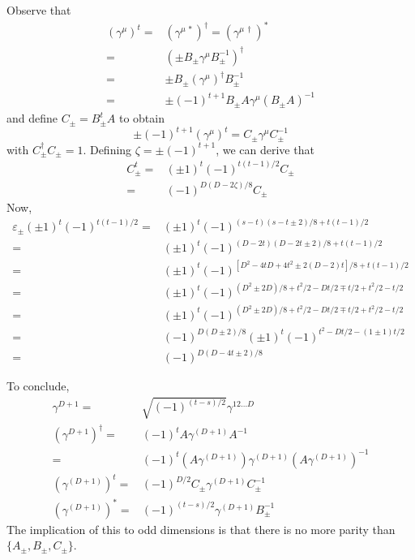 \begin{rmk}
Observe that
\begin{align*}
(\gamma ^{\mu })^{t}=&(\gamma ^{\mu \,*})^{\dagger}=(\gamma ^{\mu \,\dagger})^{*}\\
=&(\pm B_{\pm}\gamma ^{\mu }B^{-1}_{\pm})^{\dagger}\\
=&\pm B_{\pm}(\gamma ^{\mu })^{\dagger}B_{\pm}^{-1}\\
=&\pm (-1)^{t+1}B_{\pm}A\gamma ^{\mu }(B_{\pm}A)^{-1}
\end{align*}
and define $C_{\pm}=B_{\pm}^{t}A$ to obtain
\[\pm(-1)^{t+1}(\gamma ^{\mu })^{t}=C_{\pm}\gamma ^{\mu }C_{\pm}^{-1}\]
with $C_{\pm}^{\dagger}C_{\pm}=1$. Defining $\zeta = \pm(-1)^{t+1}$, we can derive that
\begin{align*}
C_{\pm}^{t}=&(\pm 1)^{t}(-1)^{t(t-1)/2}C_{\pm}\\
=&(-1)^{D(D-2\zeta)/8}C_{\pm}
\end{align*}
Now,
\begin{align*}
\varepsilon _{\pm}(\pm 1)^{t}(-1)^{t(t-1)/2}
=&(\pm 1)^{t}(-1)^{(s-t)(s-t\pm 2)/8 +t(t-1)/2}\\
=&(\pm 1)^{t}(-1)^{(D-2t)(D-2t\pm 2)/8+t(t-1)/2}\\
=&(\pm 1)^{t}(-1)^{[D^2-4tD+4t^2\pm 2(D-2)t]/8+t(t-1)/2}\\
=& (\pm 1)^{t}(-1)^{(D^2\pm 2D)/8+t^2/2-Dt/2\mp t/2+t^2/2-t/2}\\
=& (\pm 1)^{t}(-1)^{(D^2\pm 2D)/8+t^2/2-Dt/2\mp t/2+t^2/2-t/2}\\
=&(-1)^{D(D\pm 2)/8}(\pm 1)^{t}(-1)^{t^2-Dt/2-(1\pm 1)t/2}\\
=&(-1)^{D(D-4t\pm 2)/8}
\end{align*}
\end{rmk}
\vspace{2ex}
\begin{rmk}
To conclude,
\begin{align*}
\gamma ^{D+1}=&\sqrt{(-1)^{(t-s)/2}}\gamma^{12\ldots D}\\
(\gamma ^{D+1})^{\dagger}=&(-1)^{t}A\gamma ^{(D+1)}A^{-1}\\
=&(-1)^{t}(A\gamma ^{(D+1)})\gamma ^{(D+1)}(A\gamma ^{(D+1)})^{-1}\\
(\gamma ^{(D+1)})^{t}=&(-1)^{D/2}C_{\pm}\gamma ^{(D+1)}C_{\pm}^{-1}\\
(\gamma ^{(D+1)})^{*}=&(-1)^{(t-s)/2}\gamma ^{(D+1)}B_{\pm}^{-1}
\end{align*}
The implication of this to odd dimensions is that there is no more parity than $\{A_{\pm},B_{\pm},C_{\pm}\}$.
\end{rmk}
\vspace{2ex}

